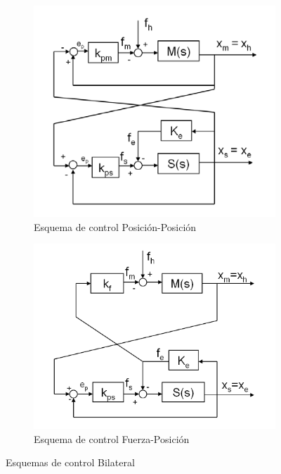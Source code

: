 \documentclass[a4paper, fontsize=11pt]{scrartcl} %
\numberwithin{equation}{section} %
\numberwithin{figure}{section} %
\numberwithin{table}{section} %
\begin{document}
	\begin{figure}[h]
		\centering
		\begin{subfigure}[t]{.5\textwidth}
			\centering
			\includegraphics[width=1\linewidth]{images/Position-Position.PNG}
			\caption{Esquema de control Posición-Posición}
			\label{Position-Position Control Scheme}
		\end{subfigure}%
		\begin{subfigure}[t]{.5\textwidth}
			\centering
			\includegraphics[width=1\linewidth]{images/Force-Position.PNG}
			\caption{Esquema de control Fuerza-Posición}
			\label{Force-Position Control Scheme}
		\end{subfigure}
		\caption{Esquemas de control Bilateral}
		\label{Control Schemes}
	\end{figure}
	
\end{document}
